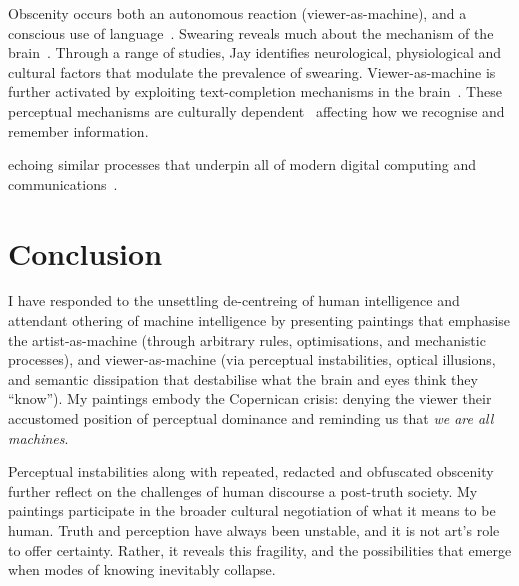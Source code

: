 \documentclass[12pt]{article}
\begin{document}
Obscenity occurs both an autonomous reaction (viewer-as-machine), and a conscious use of language~\cite{jay1999why}. Swearing reveals much about the mechanism of the brain~\cite{bergen2018what}. Through a range of studies, Jay identifies neurological, physiological and cultural factors that modulate the prevalence of swearing. Viewer-as-machine is further activated by exploiting text-completion mechanisms in the brain~\cite{Taylor1953,Reicher1969,Healy1976,GraingerWhitney2004,CohenDehaene2000,Levy2008}. These perceptual mechanisms are culturally dependent~\cite{Bartlett1932,Hall1976,ChuaBolandNisbett2005,MasudaNisbett2001} affecting how we recognise and remember information.

echoing similar processes that underpin all of modern digital computing and communications~\cite{shannon1948}.

\section{Conclusion}
I have responded to the unsettling de-centreing of human intelligence and attendant  othering of machine intelligence by presenting paintings that emphasise the artist-as-machine (through arbitrary rules, optimisations, and mechanistic processes), and viewer-as-machine (via perceptual instabilities, optical illusions, and semantic dissipation that destabilise what the brain and eyes think they ``know''). My paintings embody the Copernican crisis: denying the viewer their accustomed position of perceptual dominance and reminding us that \emph{we are all machines}.

Perceptual instabilities along with repeated, redacted and obfuscated obscenity further reflect on the challenges of human discourse a post-truth society. My paintings participate in the broader cultural negotiation of what it means to be human. Truth and perception have always been unstable, and it is not art's role to offer certainty. Rather, it reveals this fragility, and the possibilities that emerge when  modes of knowing inevitably collapse.

\newpage


\end{document}
